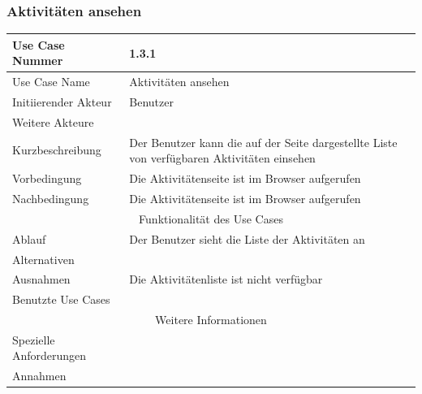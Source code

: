 \documentclass[10pt,a4paper]{article}
\begin{document}
	\subsubsection{Aktivit\"aten ansehen}
	\begin{tabular}{|l|p{.5\linewidth}|}
	\hline Use Case Nummer & 1.3.1 \\ 
	\hline Use Case Name & Aktivit\"aten ansehen \\ 
	\hline Initiierender Akteur & Benutzer \\
	\hline Weitere Akteure & \\
	\hline Kurzbeschreibung & Der Benutzer kann die auf der Seite dargestellte Liste von verf\"ugbaren Aktivit\"aten einsehen \\
	\hline Vorbedingung & Die Aktivit\"atenseite ist im Browser aufgerufen \\
	\hline Nachbedingung & Die Aktivit\"atenseite ist im Browser aufgerufen \\
	\hline \multicolumn{2}{|c|}{Funktionalität des Use Cases}\\
	\hline Ablauf & Der Benutzer sieht die Liste der Aktivit\"aten an \\
	\hline Alternativen & \\
	\hline Ausnahmen & Die Aktivit\"atenliste ist nicht verf\"ugbar \\
	\hline Benutzte Use Cases & \\
	\hline \multicolumn{2}{|c|}{Weitere Informationen} \\
	\hline Spezielle Anforderungen & \\
	\hline Annahmen & \\
	\hline
	\end{tabular} 
\end{document}
